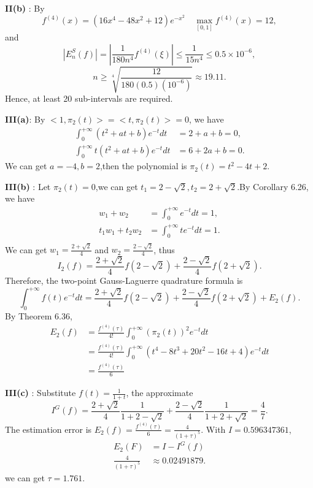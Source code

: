 \documentclass{article}
\begin{document}
\textbf{II(b)} : By
\begin{equation*}
    f^{(4)}(x) = (16x^4 - 48x^2 + 12)e^{-x^2} \quad 
\max_{[0,1]}f^{(4)}(x) = 12 ,
\end{equation*}
and
\begin{equation*}
    |E^S_n(f)| = |\frac{1}{180n^4} f^{(4)}(\xi)|   
      \leq \frac{1}{15n^4} \leq 0.5 \times 10^{-6} ,
\end{equation*}
\begin{equation*}
    n\geq \sqrt[4]{\frac{12}{180(0.5)(10^{-6})}} \approx 19.11.
\end{equation*}
Hence, at least 20 sub-intervals are required.

\textbf{III(a)}: By $<1,\pi_2(t)> = <t,\pi_2(t)> =0 $, we have
\begin{align*}
    \int_0^{+\infty}(t^2+at+b)e^{-t}dt &= 2+a+b = 0,\\
    \int_0^{+\infty}t(t^2+at+b)e^{-t}dt &= 6+2a+b = 0.
\end{align*}
We can get $a = -4, b=2$,then the polynomial is $ \pi_2(t) = t^2 -4t + 2$.

\textbf{III(b)} : Let $\pi_2(t)=0$,we can get $ t_1 = 2-\sqrt{2}, t_2 = 2+\sqrt{2}$.By Corollary 6.26, we have
\begin{align*}
    w_1+w_2 & =\int_0^{+\infty}e^{-t}dt =1,\\
    t_1w_1+t_2w_2 & =\int_0^{+\infty}te^{-t}dt =1.\\
\end{align*}
We can get $w_1=\frac{2+\sqrt{2}}{4}$ and $w_2=\frac{2-\sqrt{2}}{4}$, thus
\begin{equation*}
    I_2(f) = \frac{2+\sqrt{2}}{4}f(2-\sqrt{2}) + \frac{2-\sqrt{2}}{4}f(2+\sqrt{2}).
\end{equation*}
Therefore, the two-point Gauss-Laguerre quadrature formula is
\begin{equation*}
    \int_0^{+\infty} f(t)e^{-t}dt = \frac{2+\sqrt{2}}{4}f(2-\sqrt{2}) + \frac{2-\sqrt{2}}{4}f(2+\sqrt{2}) + E_2(f).
\end{equation*}
By Theorem 6.36, 
\begin{align*}
    E_2(f) & =  \frac{f^{(4)}(\tau)}{4!}\int_{0}^{+\infty}(\pi_2(t))^{2}e^{-t}dt \\
    & = \frac{f^{(4)}(\tau)}{4!}\int_{0}^{+\infty}(t^{4}-8t^{3}+20t^{2}-16t+4)e^{-t}dt \\
    & =\frac{f^{(4)}(\tau)}{6}    
\end{align*}  

\textbf{III(c)} : Substitute $f(t) = \frac{1}{1+t}$, the approximate
\begin{equation*}
    I^G(f) = \frac{2+\sqrt{2}}{4}\frac{1}{1+2-\sqrt{2}}+\frac{2-\sqrt{2}}{4}\frac{1}{1+2+\sqrt{2}} =\frac{4}{7}.
\end{equation*}
The estimation error is $E_2(f) =\frac{f^{(4)}(\tau)}{6} = \frac{4}{(1+\tau)^5}.$ 
With $I=0.596347361$,
\begin{align*}
    E_2(F) & = I - I^G(f) \\
    \frac{4}{(1+\tau)^5} & \approx 0.02491879.
\end{align*}
we can get $\tau = 1.761$.
\end{document}
